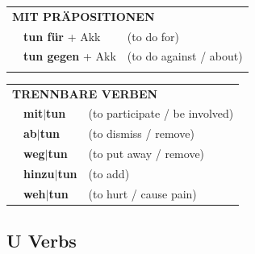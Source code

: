 \documentclass[10pt,a4paper]{revtex4-2}
\begin{document}
\begin{verbbox-acc}
\vspace{10pt}

\begin{tabular}{lll}
\multicolumn{3}{l}{\textbf{MIT PRÄPOSITIONEN}}\\
& \textbf{tun für} + Akk & (to do for)\\
& \textbf{tun gegen} + Akk & (to do against / about)\\
\vspace{30pt}
\end{tabular}
\hfill
\begin{tabular}{lll}
\multicolumn{3}{l}{\textbf{TRENNBARE VERBEN}}\\
& \textbf{mit$|$tun} & (to participate / be involved)\\
& \textbf{ab$|$tun} & (to dismiss / remove)\\
& \textbf{weg$|$tun} & (to put away / remove)\\
& \textbf{hinzu$|$tun} & (to add)\\
& \textbf{weh$|$tun} & (to hurt / cause pain)\\
\end{tabular}

\vspace{-5pt}
\end{verbbox-acc}

\subsection{U Verbs}
\end{document}
